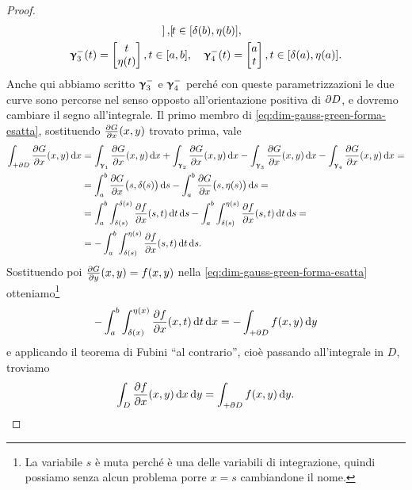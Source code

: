 \begin{proof}
\begin{gather*}
\begin{bmatrix}
		\end{bmatrix}, t\in[\delta(b),\eta(b)],\\
		\bm{\upgamma}_3^-(t)=
		\begin{bmatrix}
			t\\\eta(t)
		\end{bmatrix}, t\in[a,b],\quad 
		\bm{\upgamma}_4^-(t)=
		\begin{bmatrix}
			a\\t
		\end{bmatrix}, t\in[\delta(a),\eta(a)].
	\end{gather*}
	Anche qui abbiamo scritto $\bm{\upgamma}_3^-$ e $\bm{\upgamma}_4^-$ perché con queste parametrizzazioni le due curve sono percorse nel senso opposto all'orientazione positiva di $\partial D$, e dovremo cambiare il segno all'integrale.
	Il primo membro di \eqref{eq:dim-gauss-green-forma-esatta}, sostituendo $\frac{\partial {G}}{\partial {x}}(x,y)$ trovato prima, vale
	\begin{equation}
		\begin{split}
			\int_{+\partial D}\frac{\partial {G}}{\partial {x}}(x,y)\,\textup{d} x&=\int_{\bm{\upgamma}_1}\frac{\partial {G}}{\partial {x}}(x,y)\,\textup{d} x+\int_{\bm{\upgamma}_2}\frac{\partial {G}}{\partial {x}}(x,y)\,\textup{d} x-\int_{\bm{\upgamma}_3}\frac{\partial {G}}{\partial {x}}(x,y)\,\textup{d} x-\int_{\bm{\upgamma}_4}\frac{\partial {G}}{\partial {x}}(x,y)\,\textup{d} x=\\
			&=\int_a^b\frac{\partial {G}}{\partial {x}}\big(s,\delta(s)\big)\,\textup{d} s-\int_a^b\frac{\partial {G}}{\partial {x}}\big(s,\eta(s)\big)\,\textup{d} s=\\
			&=\int_a^b\int_{\delta(s)}^{\delta(s)}\frac{\partial {f}}{\partial {x}}(s,t)\,\textup{d} t\,\textup{d} s-\int_a^b\int_{\delta(s)}^{\eta(s)}\frac{\partial {f}}{\partial {x}}(s,t)\,\textup{d} t\,\textup{d} s=\\
			&=-\int_a^b\int_{\delta(s)}^{\eta(s)}\frac{\partial {f}}{\partial {x}}(s,t)\,\textup{d} t\,\textup{d} s.
		\end{split}
	\end{equation}
	Sostituendo poi $\frac{\partial {G}}{\partial {y}}(x,y)=f(x,y)$ nella \eqref{eq:dim-gauss-green-forma-esatta} otteniamo\footnote{La variabile $s$ è muta perché è una delle variabili di integrazione, quindi possiamo senza alcun problema porre $x=s$ cambiandone il nome.}
	\begin{equation}
		-\int_a^b\int_{\delta(x)}^{\eta(x)}\frac{\partial {f}}{\partial {x}}(x,t)\,\textup{d} t\,\textup{d} x=-\int_{+\partial D}f(x,y)\,\textup{d} y
	\end{equation}
	e applicando il teorema di Fubini ``al contrario'', cioè passando all'integrale in $D$, troviamo
	\begin{equation}
		\int_D\frac{\partial {f}}{\partial {x}}(x,y)\,\textup{d} x\,\textup{d} y=\int_{+\partial D}f(x,y)\,\textup{d} y.
	\end{equation}


\end{proof}
